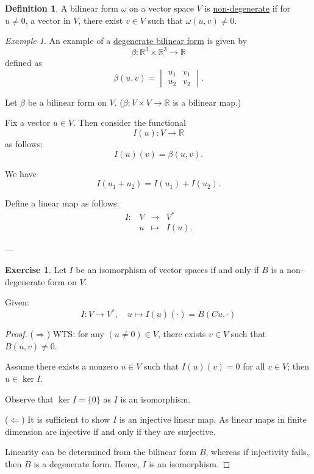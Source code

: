 \documentclass[11pt]{article}
\theoremstyle{definition}
\newtheorem{definition}{Definition}[section]
\newtheorem{exercise}{Exercise}
\theoremstyle{remark}
\newtheorem{example}{Example}[section]
\begin{document}
\begin{definition}\label{def:non-degenerate-bilinear-form}
A bilinear form $\omega$ on a vector space $V$ is \underline{non-degenerate} if for $u \neq 0$, a vector in $V$, there exist $v \in V$ such that $\omega(u, v) \neq 0$.
\end{definition}

\begin{example}\label{ex:degenerate-bilinear-form}
An example of a \underline{degenerate bilinear form} is given by
\[
\beta \colon \mathbb{R}^3 \times \mathbb{R}^3 \to \mathbb{R}
\]
defined as
\[
\beta(u, v) = \begin{vmatrix}
u_1 & v_1 \\
u_2 & v_2
\end{vmatrix}.
\]
\end{example}

Let $\beta$ be a bilinear form on $V$. ($\beta \colon V \times V \to \mathbb{R}$ is a bilinear map.)

Fix a vector $u \in V$. Then consider the functional
\[
I(u) \colon V \to \mathbb{R}
\]
as follows:
\[
I(u)(v) = \beta(u, v).
\]

We have
\[
I(u_1 + u_2) = I(u_1) + I(u_2).
\]

Define a linear map as follows:
\[
\begin{array}{rcl}
I \colon & V & \to & V^* \\
 & u & \mapsto & I(u).
\end{array}
\]

---

\begin{exercise}
Let $I$ be an isomorphism of vector spaces if and only if $B$ is a non-degenerate form on $V$.

Given:
\[
I \colon V \to V^*, \quad u \mapsto I(u)(\cdot) = B(Cu, \cdot)
\]

\begin{proof}
($\Rightarrow$) WTS: for any $(u \neq 0) \in V$, there exists $v \in V$ such that $B(u, v) \neq 0$.

Assume there exists a nonzero $u \in V$ such that $I(u)(v) = 0$ for all $v \in V$; then $u \in \ker I$.

Observe that $\ker I = \{0\}$ as $I$ is an isomorphism.

($\Leftarrow$) It is sufficient to show $I$ is an injective linear map. As linear maps in finite dimension are injective if and only if they are surjective.

Linearity can be determined from the bilinear form $B$, whereas if injectivity fails, then $B$ is a degenerate form. Hence, $I$ is an isomorphism.
\end{proof}
\end{exercise}
\end{document}

